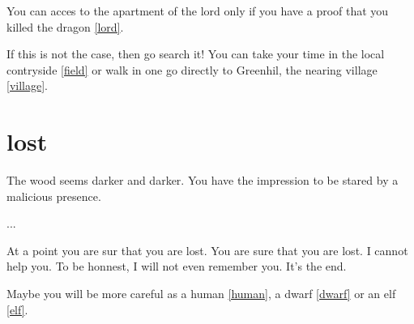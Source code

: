 You can acces to the apartment of the lord only if you have a proof that you
killed the dragon \ref{lord}.

If this is not the case, then go search it! You can take your time in the local
contryside \ref{field} or walk in one go directly to Greenhil, the nearing
village \ref{village}.

\section{lost}

The wood seems darker and darker. You have the impression to be stared by a
malicious presence. 

...

At a point you are sur that you are lost. You are sure that you are lost. I
cannot help you. To be honnest, I will not even remember you. It's the end.

Maybe you will be more careful as a human \ref{human}, a dwarf \ref{dwarf} or an
elf \ref{elf}.


